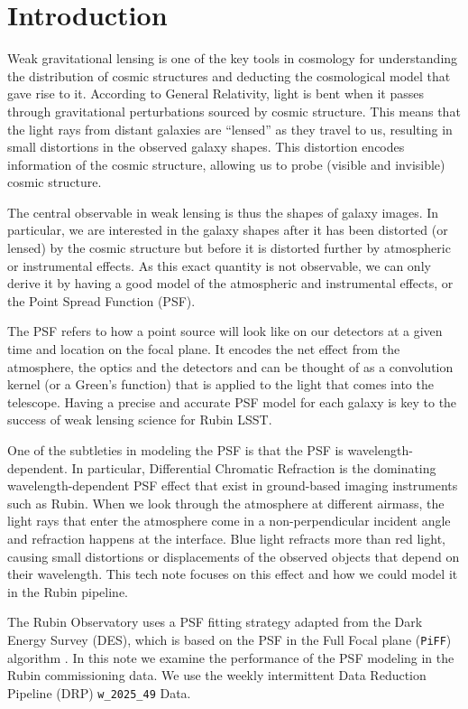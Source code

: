 \section{Introduction}
Weak gravitational lensing is one of the key tools in cosmology for understanding the distribution of cosmic structures and deducting the cosmological model that gave rise to it. 
According to General Relativity, light is bent when it passes through gravitational perturbations sourced by cosmic structure. 
This means that the light rays from distant galaxies are ``lensed'' as they travel to us, resulting in small distortions in the observed galaxy shapes. 
This distortion encodes information of the cosmic structure, allowing us to probe (visible and invisible) cosmic structure.

The central observable in weak lensing is thus the shapes of galaxy images. 
In particular, we are interested in the galaxy shapes after it has been distorted (or lensed) by the cosmic structure but before it is distorted further by atmospheric or instrumental effects.
As this exact quantity is not observable, we can only derive it by having a good model of the atmospheric and instrumental effects, or the Point Spread Function (PSF).

The PSF refers to how a point source will look like on our detectors at a given time and location on the focal plane. 
It encodes the net effect from the atmosphere, the optics and the detectors and can be thought of as a convolution kernel (or a Green's function) that is applied to the light that comes into the telescope. 
Having a precise and accurate PSF model for each galaxy is key to the success of weak lensing science for Rubin LSST.

One of the subtleties in modeling the PSF is that the PSF is wavelength-dependent. 
In particular, Differential Chromatic Refraction \citep[DCR,][]{DMTN-017} is the dominating wavelength-dependent PSF effect that exist in ground-based imaging instruments such as Rubin. When we look through the atmosphere at different airmass, the light rays that enter the atmosphere come in a non-perpendicular incident angle and refraction happens at the interface.
Blue light refracts more than red light, causing small distortions or displacements of the observed objects that depend on their wavelength. 
This tech note focuses on this effect and how we could model it in the Rubin pipeline.

The Rubin Observatory uses a PSF fitting strategy adapted from the Dark Energy Survey (DES), which is based on the PSF in the Full Focal plane (\texttt{PiFF}) algorithm \citep{jarvis2021}. 
In this note we examine the performance of the PSF modeling in the Rubin commissioning data. 
We use the weekly intermittent Data Reduction Pipeline (DRP) \texttt{w\_2025\_49} Data.

